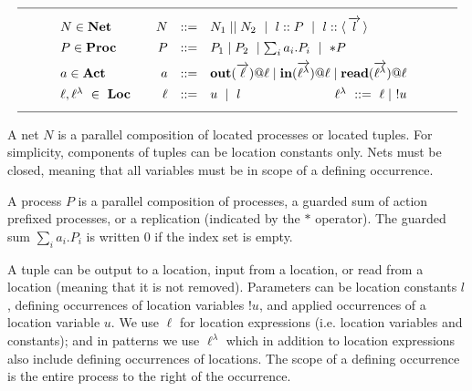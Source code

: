 \documentclass[a4paper]{llncs}
\makeatletter
\newcommand{\netpar}{\mid\mid}
\newcommand{\val}[1]{\langle\,#1\,\rangle}
\newcommand{\ppar}{\mid}
\newcommand{\Out}[2]{{\bf out}({#1})@{\it #2}}
\newcommand{\In}[2]{{\bf in}({#1})@{\it #2}}
\newcommand{\Read}[2]{{\bf read}({#1})@{\it #2}}
\newcommand{\YZl}{l}
\newcommand{\Lnt}{\ell^\lambda}
\newcommand{\Ln}{\ell}
\newcommand{\veck}[1]{\overrightarrow{#1}}
\newenvironment{ARRAY}[1]{%
  \begin{tabular*}{\textwidth}{@{\extracolsep{\fill}}c@{}c@{}c}
  \hline
  &&\\[-5pt]
  &\begin{math}\begin{array}{@{} #1 @{}}
}
{ \end{array}\end{math}&\\
  &&\\[-5pt]
  \hline
  \end{tabular*}
}
\makeatother
\begin{document}
\begin{table}[t]
$$
\begin{ARRAY}{l@{\qquad}rcl}
N  \in  {\bf Net} &
N & ::= & N_1\netpar N_2\ \mid\ \YZl::P\ \mid\
\YZl::\val{\veck{\YZl}}

\\[1ex]
P  \in  {\bf Proc} &
P & ::= &  P_1\ppar P_2\ \mid \sum_i a_i.P_i\ \mid\ *P

\\[1ex]
a  \in  {\bf Act} &
a & ::= & \Out{\veck{\ell}}{\ell} \mid \In{\veck{\ell^{\lambda}}}{\ell} \mid
   \Read{\veck{\ell^\lambda}}{\ell}
\\[1ex]
\Ln,\Lnt \ \in \ {\bf Loc} &
\Ln & ::= & u \  \mid\ \YZl \hfill 
  \Lnt\  ::= \  \Ln \mid\ !u  
\end{ARRAY}
$$
\caption{KLAIM Nets and Processes Syntax} \label{klaim:syn_NetProcess}
\end{table}

A net $N$ is a parallel composition of located processes or located
tuples. For simplicity, components of tuples can be location constants
only. Nets must be closed, meaning that all variables must be in scope
of a defining occurrence.

A process $P$ is a parallel composition of processes, a guarded sum of
action prefixed processes, or a replication (indicated by the $*$
operator).  The guarded sum $\sum_i a_i.P_i$ is written 0 if the index
set is empty.

A tuple can be output to a location, input from a location, or read
from a location (meaning that it is not removed).  Parameters can be
location constants $l$, defining occurrences of location variables
$!u$, and applied occurrences of a location variable $u$. We use
$\ell$ for location expressions (i.e.  location variables and
constants); and in patterns we use $\ell^\lambda$ which in addition to location expressions also include defining
occurrences of locations.  The scope of a defining occurrence is the
entire process to the right of the occurrence.  
\end{document}
